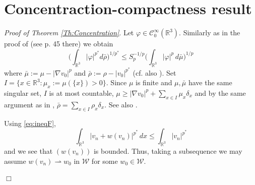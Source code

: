 \documentclass[12pt,leqno,twoside]{amsart}
\newenvironment{altproof}[1]
{\noindent%
{\em Proof of {#1}}.}
{\nopagebreak\mbox{}\hfill $\Box$\par\addvspace{0.5cm}}
\newcommand{\vp}{\varphi}
\def\R{\mathbb{R}}
\newcommand{\cC}{{\mathcal C}}
\newcommand{\cW}{{\mathcal W}}
\def\vp{\varphi}
\newcommand{\weakto}{\rightharpoonup}
\numberwithin{equation}{section}
\begin{document}
\section{Concentraction-compactness result}\label{appendix:concom}

\begin{altproof}{Theorem \ref{Th:Concentration}}
	Let $\vp\in\cC_0^{\infty}(\R^3)$. Similarly as in the proof of  \cite[Concentration-Compactness Lemma II]{Struwe} (see p. 45 there)
	we obtain
	\begin{equation*} \label{eq:standardLions2}
	\Big(\int_{\R^3}|\vp|^{p^*}d\bar\rho\Big)^{1/p^*} \le S_p^{-1/p}\Big(\int_{\R^3}|\vp|^p\,d\bar{\mu}\Big)^{1/p}
	\end{equation*}
	where 
	$\bar{\mu}:=\mu-|\nabla v_0|^p$ and $\bar{\rho}:=\rho-|v_0|^{p^*}$ (cf. also \cite[(3.4) and (3.5)]{MedSz}).
	Set $I=\{x\in\R^3: \mu_x:=\mu(\{x\})>0\}$. Since $\mu$ is finite and $\mu, \bar\mu$ have the same singular set,  $I$ is at most countable,
	$\mu\geq |\nabla v_0|^p+\sum_{x\in I}\mu_x\delta_x$
	and by the same argument as in \cite[p. 46]{Struwe},
	$\bar\rho = \sum_{x\in I}\rho_x\delta_x$. See also \cite[Proposition 4.2]{wa}.
	
	Using \eqref{eq:ineqF}, 
	$$\int_{\R^3}|v_n+w(v_n)|^{p^*}\,dx \le \int_{\R^3}|v_n|^{p^*}$$
	and	we see that $(w(v_n))$ is bounded.
	Thus, taking a subsequence we may assume $w(v_n)\weakto w_0$ in $\cW$ for some $w_0\in\cW$. 
	

\end{altproof}
\end{document}
